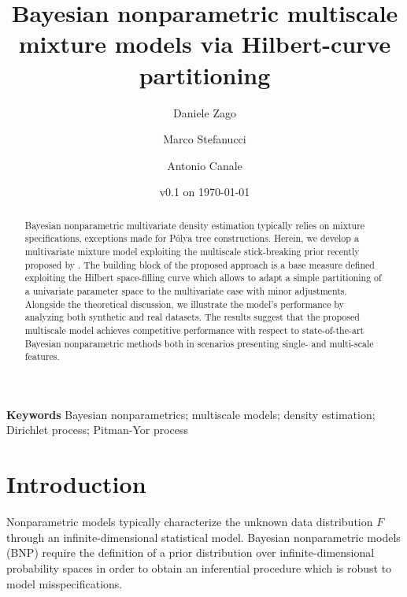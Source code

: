 \documentclass[nonatbib]{elsarticle}
\begin{document}
\title{Bayesian nonparametric multiscale mixture models via Hilbert-curve partitioning}
\author[add1]{Daniele Zago}
\author[add1,add2]{Marco Stefanucci}
\author[add1]{Antonio Canale}



\address[add1]{Department of Statistical Sciences, University of Padova, Padova, Italy}
\address[add2]{Department of Economic, Business, Mathematical and Statistical Sciences, University of Trieste, Trieste, Italy}
\date{v0.1 on \today}

\begin{abstract}
    Bayesian nonparametric multivariate density estimation typically relies on mixture specifications, exceptions made for Pólya tree constructions. Herein, we develop a multivariate mixture model exploiting the multiscale stick-breaking prior recently proposed by \textcite{stefanucci2021}. The building block of the proposed approach is a base measure defined exploiting the Hilbert
    space-filling curve which allows to adapt a simple partitioning of a univariate parameter space to the multivariate case with minor adjustments. Alongside the theoretical discussion, we illustrate the model's performance by analyzing both synthetic and real datasets. The results suggest that the proposed multiscale model achieves competitive performance with respect to state-of-the-art Bayesian nonparametric methods both in scenarios presenting single- and multi-scale features.
\end{abstract}

\maketitle

\textbf{Keywords} Bayesian nonparametrics; multiscale models; density estimation; Dirichlet process; Pitman-Yor process

\section{Introduction}\label{sec:intro}
Nonparametric models typically characterize the unknown data distribution $F$ through an infinite-dimensional statistical model.
Bayesian nonparametric models (BNP) require the definition of a prior distribution over infinite-dimensional probability spaces in order to obtain an inferential procedure which is robust to model misspecifications.
\end{document}
